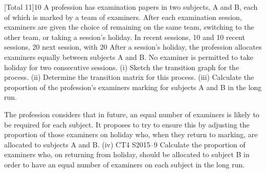 
[Total 11]10
A profession has examination papers in two subjects, A and B, each of which is
marked by a team of examiners. After each examination session, examiners are given
the choice of remaining on the same team, switching to the other team, or taking a
session’s holiday.
In recent sessions, 10%
and 10%
recent sessions, 20%
next session, with 20%
After a session’s holiday, the profession allocates examiners equally between subjects
A and B. No examiner is permitted to take holiday for two consecutive sessions.
(i) Sketch the transition graph for the process. 
(ii) Determine the transition matrix for this process. 
(iii) Calculate the proportion of the profession’s examiners marking for subjects A
and B in the long run.

The profession considers that in future, an equal number of examiners is likely to be
required for each subject. It proposes to try to ensure this by adjusting the proportion
of those examiners on holiday who, when they return to marking, are allocated to
subjects A and B.
(iv)
CT4 S2015–9
Calculate the proportion of examiners who, on returning from holiday, should
be allocated to subject B in order to have an equal number of examiners on
each subject in the long run.

